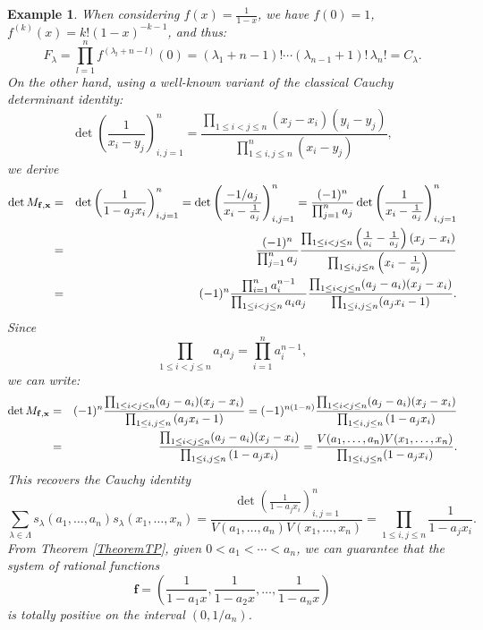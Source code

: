 \documentclass[smallextended]{svjour3}       %
\newtheorem{exmp}{Example}
\begin{document}
\begin{exmp}
When considering $f(x)=\frac{1}{1-x}$, we have $f(0)=1$,  $f^{(k)}(x)= k! (1-x)^{-k-1}$, and thus:
\[
F_\lambda =\prod_{l=1}^n  f^{(\lambda_l+n-l)}(0)=  (\lambda_1+n-1)!\cdots  (\lambda_{n-1}+1)! \, \lambda_n!=C_\lambda.\] 
On the other hand, using a well-known variant of the classical Cauchy determinant identity:
\begin{equation*}
    \det\left( \frac{1}{x_i - y_j}\right)_{i,j=1}^n = \frac{  \prod_{1\le i < j \le n } (x_j-x_i)   (y_i-y_j) } { \prod_{1\le i,j \le n }^n(x_i - y_j)},
\end{equation*}
we derive 
\begin{eqnarray*}
     \det M_{\bf f,  \bf x} &=& \det \left( \frac{1}{1 - a_j x_i} \right)_{i,j=1}^n =
     \det \left( \frac{-1/a_j}{x_i -\frac{1}{ a_j} }\right)_{i,j=1}^n = 
 \frac{ (-1)^n }{\prod_{j=1}^na_j}   
 \det \left( \frac{ 1 }{x_i -\frac{1}{ a_j} }\right)_{i,j=1}^n \\
&=& \frac{ (-1)^n }{\prod_{j=1}^na_j}      \frac{  \prod_{1\le i < j \le n } \left(\frac{1}{a_i}-\frac{1}{a_j} \right)(x_j-x_i)   }{ \prod_{1\le i , j \le n} \left(x_i -\frac{1}{ a_j}\right)} \\
&=& 
        (-1)^n\frac{\prod_{i=1}^na_i^{n-1}}{  \prod_{1\le i < j \le n}a_i a_j}  \frac{   \prod_{1\le i< j \le n} (a_j-a_i)(x_j-x_i)}{\prod_{1\le i , j \le n} (a_jx_i -1)}. 
 \end{eqnarray*}
Since 
\[ 
\prod_{1\le i < j \le n } a_i a_j = \prod_{i=1}^n a_i^{n-1},
\]
we can write:
\begin{eqnarray}
    \det M_{\bf f,  \bf x}&=&   (-1)^n    \frac{    \prod_{1\le i < j \le n }  (a_j-a_i )(x_j-x_i)    }{  \prod_{1\le i , j \le n} \left(a_j x_i  - 1 \right)}  = 
 (-1)^{n(1-n)}    \frac{    \prod_{1\le i < j \le n }     (a_j-a_i )(x_j-x_i) }{  \prod_{1\le i , j \le n} \left(1- a_j x_i   \right)} \nonumber \\
 &=&   \frac{    \prod_{1\le i < j \le n }    (a_j-a_i )(x_j-x_i)  }{  \prod_{1\le i , j \le n} \left(1- a_j x_i   \right)}=\frac{  V( a_1,\dots,a_n) V( x_1,\dots,x_n)   }{\prod_{1\le i , j \le n}(1 - a_j x_i)}.\label{eq:detC0}
\end{eqnarray}
This recovers the Cauchy identity
\[
     \sum_{\lambda\in\Lambda} s_\lambda(a_1,\dots,a_n)s_\lambda(x_1,\dots,x_n) = \frac{\det \left( \frac{1}{1 - a_j x_i} \right)_{i,j=1}^n }{ V( a_1,\dots,a_n) V( x_1,\dots,x_n)  }=  \prod_{1\le i,j\le n}\frac{1}{1 - a_j x_i}.
\]
 From Theorem \ref{TheoremTP}, given $0<a_1<\cdots<a_n$, we can guarantee that the system of rational functions 
$$
{\mathbf f}=\left( \frac{1}{1-a_1x}, \frac{1}{1-a_2x},\ldots , \frac{1}{1-a_nx}\right)
$$
is totally positive on the interval $(0,1/a_n)$.
\end{exmp}
\end{document}
